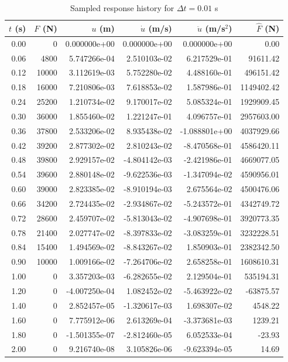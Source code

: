 \begin{table}[H]
\centering
\scriptsize
\caption{Sampled response history for $\Delta t = 0.01$ s}
\begin{tabular}{rrrrrr}
\hline
$t$ (s) & $F$ (N) & $u$ (m) & $\dot{u}$ (m/s) & $\ddot{u}$ (m/s$^2$) & $\hat{F}$ (N) \\
\hline
0.00 & 0 & 0.000000e+00 & 0.000000e+00 & 0.000000e+00 & 0.00 \\
0.06 & 4800 & 5.747266e-04 & 2.510103e-02 & 6.217529e-01 & 91611.42 \\
0.12 & 10000 & 3.112619e-03 & 5.752280e-02 & 4.488160e-01 & 496151.42 \\
0.18 & 16000 & 7.210806e-03 & 7.618853e-02 & 1.587986e-01 & 1149402.42 \\
0.24 & 25200 & 1.210734e-02 & 9.170017e-02 & 5.085324e-01 & 1929909.45 \\
0.30 & 36000 & 1.855460e-02 & 1.221247e-01 & 4.096757e-01 & 2957603.00 \\
0.36 & 37800 & 2.533206e-02 & 8.935438e-02 & -1.088801e+00 & 4037929.66 \\
0.42 & 39200 & 2.877302e-02 & 2.810243e-02 & -8.470568e-01 & 4586420.11 \\
0.48 & 39800 & 2.929157e-02 & -4.804142e-03 & -2.421986e-01 & 4669077.05 \\
0.54 & 39600 & 2.880148e-02 & -9.622536e-03 & -1.347094e-02 & 4590956.01 \\
0.60 & 39000 & 2.823385e-02 & -8.910194e-03 & 2.675564e-02 & 4500476.06 \\
0.66 & 34200 & 2.724435e-02 & -2.934867e-02 & -5.243572e-01 & 4342749.72 \\
0.72 & 28600 & 2.459707e-02 & -5.813043e-02 & -4.907698e-01 & 3920773.35 \\
0.78 & 21400 & 2.027747e-02 & -8.397833e-02 & -3.083259e-01 & 3232228.51 \\
0.84 & 15400 & 1.494569e-02 & -8.843267e-02 & 1.850903e-01 & 2382342.50 \\
0.90 & 10000 & 1.009166e-02 & -7.264706e-02 & 2.658258e-01 & 1608610.31 \\
1.00 & 0 & 3.357203e-03 & -6.282655e-02 & 2.129504e-01 & 535194.31 \\
1.20 & 0 & -4.007250e-04 & 1.082452e-02 & -5.463922e-02 & -63875.57 \\
1.40 & 0 & 2.852457e-05 & -1.320617e-03 & 1.698307e-02 & 4548.22 \\
1.60 & 0 & 7.775912e-06 & 2.613269e-04 & -3.373681e-03 & 1239.21 \\
1.80 & 0 & -1.501355e-07 & -2.812460e-05 & 6.052533e-04 & -23.93 \\
2.00 & 0 & 9.216740e-08 & 3.105826e-06 & -9.623394e-05 & 14.69 \\
\hline
\end{tabular}
\end{table}
\FloatBarrier

